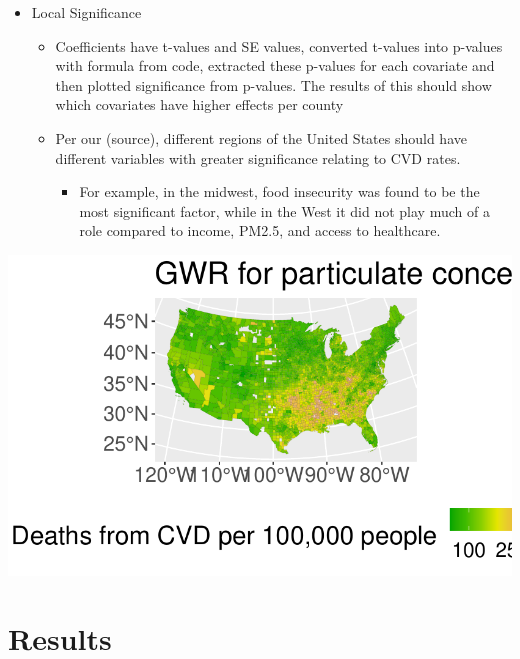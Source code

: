 \documentclass[
]{article}
\providecommand{\tightlist}{%
  \setlength{\itemsep}{0pt}\setlength{\parskip}{0pt}}\usepackage{longtable,booktabs,array}
\begin{document}
\begin{itemize}
\item
  Local Significance

  \begin{itemize}
  \item
    Coefficients have t-values and SE values, converted t-values into
    p-values with formula from code, extracted these p-values for each
    covariate and then plotted significance from p-values. The results
    of this should show which covariates have higher effects per county
  \item
    Per our (source), different regions of the United States should have
    different variables with greater significance relating to CVD rates.

    \begin{itemize}
    \tightlist
    \item
      For example, in the midwest, food insecurity was found to be the
      most significant factor, while in the West it did not play much of
      a role compared to income, PM2.5, and access to healthcare.
    \end{itemize}
  \end{itemize}
\end{itemize}

\includegraphics{report_files/figure-pdf/unnamed-chunk-2-1.pdf}

\section{Results}\label{results}
\end{document}
